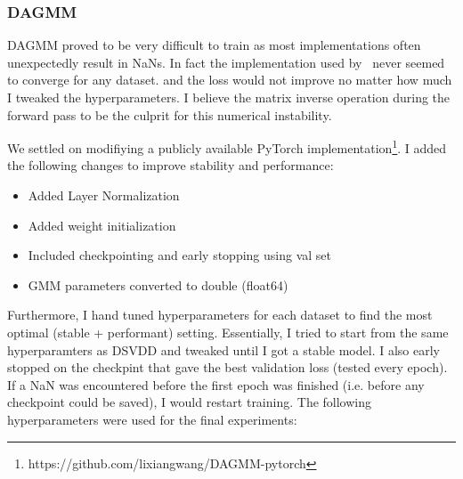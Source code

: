 \subsubsection*{DAGMM}
DAGMM proved to be very difficult to train as most implementations often unexpectedly result in NaNs. In fact the implementation used by~\cite{han2022adbench} never seemed to converge for any dataset. and the loss would not improve no matter how much I tweaked the hyperparameters. I believe the matrix inverse operation during the forward pass to be the culprit for this numerical instability. 

We settled on modifiying a publicly available PyTorch implementation\footnote{https://github.com/lixiangwang/DAGMM-pytorch}. I added the following changes to improve stability and performance:

\begin{itemize}
    \item Added Layer Normalization
    \item Added weight initialization
    \item Included checkpointing and early stopping using val set
    \item GMM parameters converted to double (float64)
\end{itemize}

Furthermore, I hand tuned hyperparameters for each dataset to find the most optimal (stable + performant) setting. Essentially, I tried to start from the same hyperparamters as DSVDD and tweaked until I got a stable model. I also early stopped on the checkpint that gave the best validation loss (tested every epoch). If a NaN was encountered before the first epoch was finished (i.e. before any checkpoint could be saved), I would restart training. The following hyperparameters were used for the final experiments:

